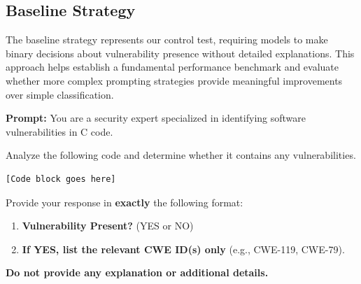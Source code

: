 \documentclass[sigconf,review,anonymous]{acmart}
\begin{document}
\subsection{Baseline Strategy}
The baseline strategy represents our control test, requiring models to make binary decisions about vulnerability presence without detailed explanations. This approach helps establish a fundamental performance benchmark and evaluate whether more complex prompting strategies provide meaningful improvements over simple classification.
\begin{tcolorbox}[colback=bluebox, colframe=blue!60!black, 
title=\textbf{Baseline Strategy (YES/NO + CWE Only)}, 
sharp corners=south, boxrule=1pt, width=\linewidth]
\textbf{Prompt:}  
You are a security expert specialized in identifying software vulnerabilities in C code.

Analyze the following code and determine whether it contains any vulnerabilities.

\begin{verbatim}
[Code block goes here]
\end{verbatim}

Provide your response in \textbf{exactly} the following format:
\begin{enumerate}
    \item \textbf{Vulnerability Present?} (YES or NO)
    \item \textbf{If YES, list the relevant CWE ID(s) only} (e.g., CWE-119, CWE-79).
\end{enumerate}

\textbf{Do not provide any explanation or additional details.}
\end{tcolorbox}


\end{document}
